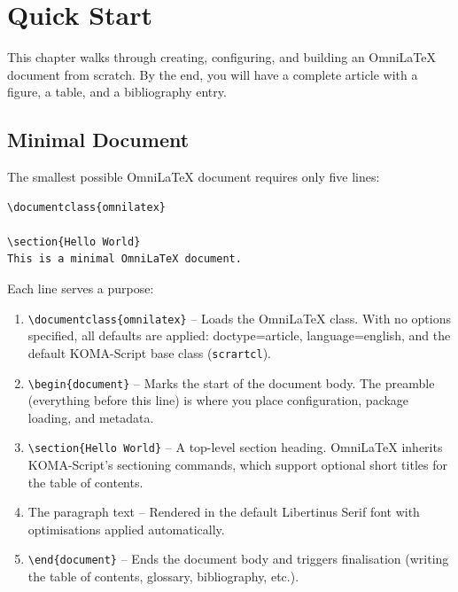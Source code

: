 \chapter{Quick Start}
\label{ch:quickstart}

This chapter walks through creating, configuring, and building an OmniLaTeX
document from scratch.  By the end, you will have a complete article with a
figure, a table, and a bibliography entry.

\section{Minimal Document}

The smallest possible OmniLaTeX document requires only five lines:

\begin{verbatim}
\documentclass{omnilatex}

\section{Hello World}
This is a minimal OmniLaTeX document.

\end{verbatim}

Each line serves a purpose:

\begin{enumerate}
    \item \texttt{\textbackslash documentclass\{omnilatex\}} -- Loads the
          OmniLaTeX class.  With no options specified, all defaults are applied:
          \textsf{doctype=article}, \textsf{language=english}, and the default
          KOMA-Script base class (\texttt{scrartcl}).
    \item \texttt{\textbackslash begin\{document\}} -- Marks the start of the
          document body.  The preamble (everything before this line) is where
          you place configuration, package loading, and metadata.
    \item \texttt{\textbackslash section\{Hello World\}} -- A top-level
          section heading.  OmniLaTeX inherits KOMA-Script's sectioning
          commands, which support optional short titles for the table of
          contents.
    \item The paragraph text -- Rendered in the default Libertinus Serif font
          with  optimisations applied automatically.
    \item \texttt{\textbackslash end\{document\}} -- Ends the document body
          and triggers finalisation (writing the table of contents, glossary,
          bibliography, etc.).
\end{enumerate}

